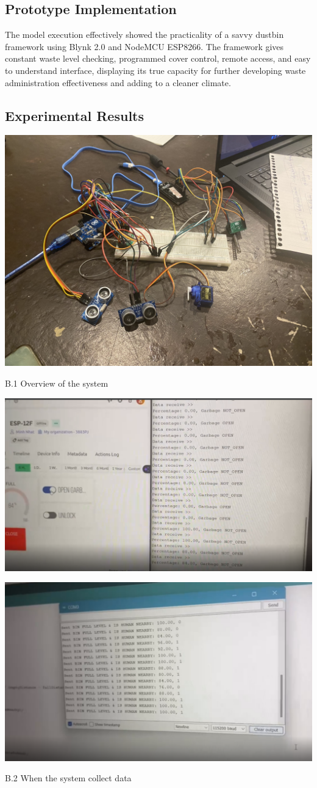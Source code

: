 \documentclass[conference, onecolumn]{IEEEtran}
\begin{document}
\subsection{Prototype Implementation}
The model execution effectively showed the practicality of a savvy dustbin framework using Blynk 2.0 and NodeMCU ESP8266. The framework gives constant waste level checking, programmed cover control, remote access, and easy to understand interface, displaying its true capacity for further developing waste administration effectiveness and adding to a cleaner climate.\\

\subsection{Experimental Results}
\begin{center}
\centerline{\includegraphics[width=3.8 in]{design1.png}}
B.1 Overview of the system
\end{center}

\begin{center}
\centerline{\includegraphics[width=3.8 in]{receive.png}}
\centerline{\includegraphics[width=3.8 in]{receive2.png}}
B.2 When the system collect data
\end{center}
\end{document}
